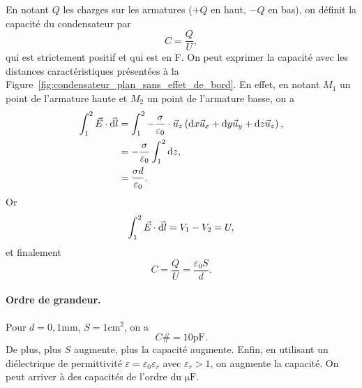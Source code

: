             En notant $Q$ les charges sur les armatures ($+Q$ en haut, $-Q$ en bas), on définit la capacité du condensateur par 
            \begin{equation}
                \boxed{
                    C=\frac{Q}{U},
                }
            \end{equation}
            qui est strictement positif et qui est en \si{\farad}. On peut exprimer la capacité avec les distances caractéristiques présentées à la Figure~\ref{fig:condensateur_plan_sans_effet_de_bord}. En effet, en notant $M_1$ un point de l'armature haute et $M_2$ un point de l'armature basse, on a 
            \begin{align}
                \int_{1}^{2}\vec{E}\cdot\vec{\mathrm{d} l}
                &=
                \int_{1}^{2}-\frac{\sigma}{\varepsilon_0}\cdot\vec{u}_z\left(\mathrm{d} x\vec{u}_x+\mathrm{d} y\vec{u}_y+\mathrm{d} z\vec{u}_z\right),\\
                &=
                -\frac{\sigma}{\varepsilon_0}\int_{1}^{2}\mathrm{d} z,\\
                &=
                \frac{\sigma d}{\varepsilon_0}.
            \end{align}
            Or 
            \begin{equation}
                \int_{1}^{2}\vec{E}\cdot\vec{\mathrm{d} l}=V_1-V_2=U,
            \end{equation}
            et finalement
            \begin{equation}
                \boxed{
                    C=\frac{Q}{U}=\frac{\varepsilon_0 S}{d}.
                }
            \end{equation}

            \paragraph{Ordre de grandeur.} Pour $d=0,1\si{\milli\metre}$, $S=1\si{\centi\metre\squared}$, on a 
            \begin{equation}
                C\#=10\si{\pico\farad}.
            \end{equation}
            De plus, plus $S$ augmente, plus la capacité augmente. Enfin, en utilisant un diélectrique de permittivité $\varepsilon=\varepsilon_0\varepsilon_r$ avec $\varepsilon_r>1$, on augmente la capacité. On peut arriver à des capacités de l'ordre du $\si{\micro\farad}$.
